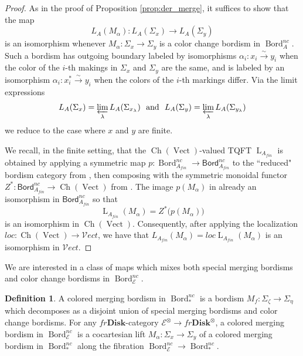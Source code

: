 \documentclass[reqno]{amsart}
\theoremstyle{definition}
\newtheorem{definition}[lemma]{Definition}
\newcommand{\msc}[1]{\mathscr{#1}}
\newcommand{\msf}[1]{\mathsf{#1}}
\newcommand{\opn}[1]{\operatorname{#1}}
\newcommand{\ot}{\otimes}
\newcommand{\Vect}{\msc{V}\!ect}
\newcommand{\Disk}{\mathbf{Disk}}
\DeclareMathOperator{\Bord}{Bord}
\renewcommand{\1}{\mathbf{1}}
\begin{document}
\begin{proof}
As in the proof of Proposition \ref{prop:der_merge}, it suffices to show that the map
\[
L_{A}(M_{\alpha}):L_{A}(\Sigma_x)\to L_{A}(\Sigma_y)
\]
is an isomorphism whenever $M_{\alpha}:\Sigma_x\to \Sigma_y$ is a color change bordism in $\Bord_{A}^{nc}$.  Such a bordism has outgoing boundary labeled by isomorphisms $\alpha_i:x_i\overset{\sim}\to y_i$ when the color of the $i$-th makings in $\Sigma_x$ and $\Sigma_y$ are the same, and is labeled by an isomorphism $\alpha_i:x_i^{\ast}\overset{\sim}\to y_i$ when the colors of the $i$-th markings differ.  Via the limit expressions
\[
L_{A}(\Sigma_x)=\varprojlim_{\lambda}L_{A}(\Sigma_{x_{\lambda}})\ \ \text{and}\ \ L_{A}(\Sigma_y)=\varprojlim_{\lambda} L_{A}(\Sigma_{y_{\lambda}})
\]
we reduce to the case where $x$ and $y$ are finite.
\par

We recall, in the finite setting, that the $\opn{Ch}(\opn{Vect})$-valued TQFT $\opn{L}_{A_{fin}}$ is obtained by applying a symmetric map $p:\Bord_{A_{fin}}^{nc}\to \msf{Bord}_{A_{fin}}^{nc}$ to the ``reduced" bordism category from \cite[Section 8.1]{czenkynegron}, then composing with the symmetric monoidal functor $Z^{\ast}:\msf{Bord}_{A_{fin}}^{nc}\to \opn{Ch}(\opn{Vect})$ from \cite[Theorem 9.3]{czenkynegron}.  The image $p(M_{\alpha})$ in already an isomorphism in $\msf{Bord}_{A_{fin}}^{nc}$ so that
\[
\opn{L}_{A_{fin}}(M_{\alpha})=Z^{\ast}\big(p(M_{\alpha})\big)
\]
is an isomorphism in $\opn{Ch}(\opn{Vect})$.  Consequently, after applying the localization $loc:\opn{Ch}(\opn{Vect})\to \Vect$, we have that $L_{A_{fin}}(M_{\alpha})=loc \opn{L}_{A_{fin}}(M_{\alpha})$ is an isomorphism in $\Vect$.
\end{proof}

We are interested in a class of maps which mixes both special merging bordisms and color change bordisms in $\Bord_{\msc{E}}^{nc}$.

\begin{definition}
A colored merging bordism in $\Bord_{\ast}^{nc}$ is a bordism $M_f:\Sigma_{\zeta}\to \Sigma_{\eta}$ which decomposes as a disjoint union of special merging bordisms and color change bordisms.  For any $fr\Disk$-category $\msc{E}^{\ot}\to fr\Disk^{\ot}$, a colored merging bordism in $\Bord_{\msc{E}}^{nc}$ is a cocartesian lift $M_{\alpha}:\Sigma_x\to \Sigma_y$ of a colored merging bordism in $\Bord_{\ast}^{nc}$ along the fibration $\Bord^{nc}_{\msc{E}}\to \Bord^{nc}_{\ast}$.
\end{definition}
\end{document}
